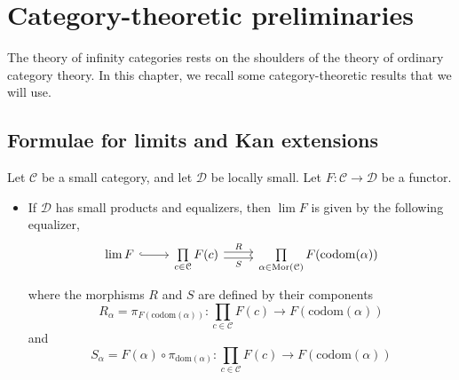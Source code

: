 \documentclass[main.tex]{subfiles}
\begin{document}
\chapter{Category-theoretic preliminaries}
\label{ch:category_theoretic_preliminaries}

The theory of infinity categories rests on the shoulders of the theory of ordinary category theory. In this chapter, we recall some category-theoretic results that we will use.

\section{Formulae for limits and Kan extensions}
\label{sec:formulae_for_limits_and_kan_extensions}

\begin{fact}
  \label{fact:limit_colimit_formula}
  Let $\mathcal{C}$ be a small category, and let $\mathcal{D}$ be locally small. Let $F\colon \mathcal{C} \to \mathcal{D}$ be a functor.
  \begin{itemize}
    \item If $\mathcal{D}$ has small products and equalizers, then $\lim F$ is given by the following equalizer,
      \begin{equation*}
        \begin{tikzcd}
          \lim F
          \arrow[r, hookrightarrow]
          & \prod\limits_{c \in \mathcal{C}} F(c)
          \arrow[r, shift left, "R"]
          \arrow[r, shift right, swap, "S"]
          & \prod\limits_{\alpha \in \mathrm{Mor}(\mathcal{C})} F(\mathrm{codom}(\alpha))
        \end{tikzcd}
      \end{equation*}
      where the morphisms $R$ and $S$ are defined by their components
      \begin{equation*}
        R_{\alpha} = \pi_{F(\mathrm{codom}(\alpha))}\colon \prod\limits_{c \in \mathcal{C}} F(c) \to F(\mathrm{codom}(\alpha))
      \end{equation*}
      and
      \begin{equation*}
        S_{\alpha} = F(\alpha) \circ \pi_{\mathrm{dom}(\alpha)}\colon \prod\limits_{c \in \mathcal{C}} F(c) \to F(\mathrm{codom}(\alpha))
      \end{equation*}


\end{itemize}
\end{fact}
\end{document}
